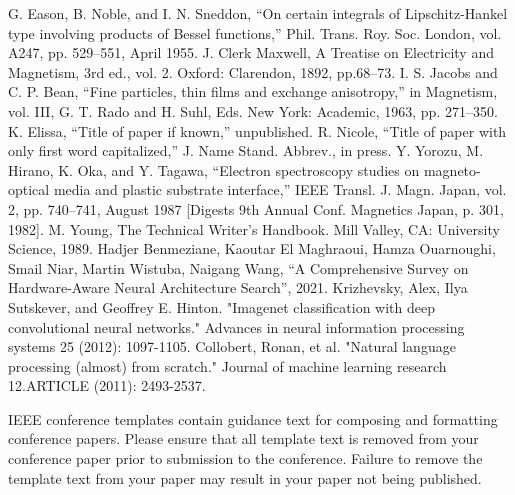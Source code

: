 \documentclass[conference]{IEEEtran}
\begin{document}
\begin{thebibliography}{00}
 G. Eason, B. Noble, and I. N. Sneddon, ``On certain integrals of Lipschitz-Hankel type involving products of Bessel functions,'' Phil. Trans. Roy. Soc. London, vol. A247, pp. 529--551, April 1955.
 J. Clerk Maxwell, A Treatise on Electricity and Magnetism, 3rd ed., vol. 2. Oxford: Clarendon, 1892, pp.68--73.
 I. S. Jacobs and C. P. Bean, ``Fine particles, thin films and exchange anisotropy,'' in Magnetism, vol. III, G. T. Rado and H. Suhl, Eds. New York: Academic, 1963, pp. 271--350.
 K. Elissa, ``Title of paper if known,'' unpublished.
 R. Nicole, ``Title of paper with only first word capitalized,'' J. Name Stand. Abbrev., in press.
 Y. Yorozu, M. Hirano, K. Oka, and Y. Tagawa, ``Electron spectroscopy studies on magneto-optical media and plastic substrate interface,'' IEEE Transl. J. Magn. Japan, vol. 2, pp. 740--741, August 1987 [Digests 9th Annual Conf. Magnetics Japan, p. 301, 1982].
 M. Young, The Technical Writer's Handbook. Mill Valley, CA: University Science, 1989.
 Hadjer Benmeziane, Kaoutar El Maghraoui, Hamza Ouarnoughi, Smail Niar, Martin Wistuba, Naigang Wang, ``A Comprehensive Survey on Hardware-Aware Neural Architecture Search'', 2021.
 Krizhevsky, Alex, Ilya Sutskever, and Geoffrey E. Hinton. "Imagenet classification with deep convolutional neural networks." Advances in neural information processing systems 25 (2012): 1097-1105.
 Collobert, Ronan, et al. "Natural language processing (almost) from scratch." Journal of machine learning research 12.ARTICLE (2011): 2493-2537.
\end{thebibliography}
\vspace{12pt}
\color{red}
IEEE conference templates contain guidance text for composing and formatting conference papers. Please ensure that all template text is removed from your conference paper prior to submission to the conference. Failure to remove the template text from your paper may result in your paper not being published.
\end{document}
